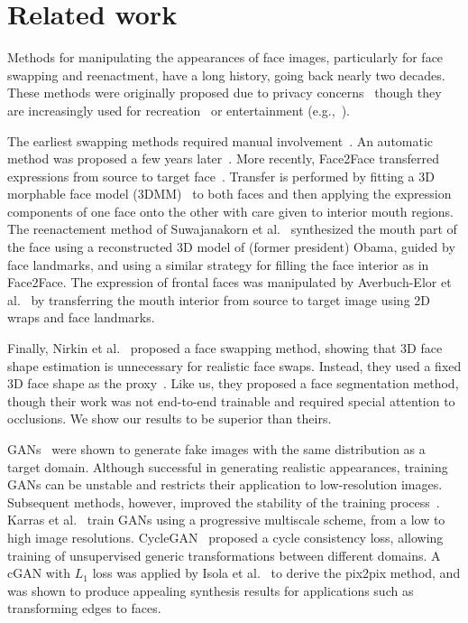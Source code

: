 \section{Related work}\label{sec:related_work}
Methods for manipulating the appearances of face images, particularly for face swapping and reenactment, have a long history, going back nearly two decades. These methods were originally proposed due to privacy concerns~\cite{blanz2004exchanging,lin2012face,mosaddegh2014photorealistic} though they are increasingly used for recreation~\cite{kemelmacher2016transfiguring} or entertainment (e.g.,~\cite{alexander2009creating,wolf2010eye}). %

The earliest swapping methods required manual involvement~\cite{blanz2004exchanging}. An automatic method was proposed a few years later~\cite{bitouk2008face}. More recently, Face2Face transferred expressions from source to target face~\cite{thies2016face2face}. Transfer is performed by fitting a 3D morphable face model (3DMM)~\cite{blanz2002face,blanz2003face,chang2019deep} to both faces and then applying the expression components of one face onto the other with care given to interior mouth regions. The reenactement method of Suwajanakorn et al.~\cite{suwajanakorn2017synthesizing} synthesized the mouth part of the face using a reconstructed 3D model of (former president) Obama, guided by face landmarks, and using a similar strategy for filling the face interior as in Face2Face. The expression of frontal faces was manipulated by Averbuch-Elor et al.~\cite{averbuch2017bringing} by transferring the mouth interior from source to target image using 2D wraps and face landmarks. 

Finally, Nirkin et al.~\cite{nirkin2018face} proposed a face swapping method, showing that 3D face shape estimation is unnecessary for realistic face swaps. Instead, they used a fixed 3D face shape as the proxy~\cite{hassner2015effective,masi2019face}. Like us, they proposed a face segmentation method, though their work was not end-to-end trainable and required special attention to occlusions. We show our results to be superior than theirs.

 GANs~\cite{goodfellow2014generative} were shown to generate fake images with the same distribution as a target domain. Although successful in generating realistic appearances, training GANs can be unstable and restricts their application to low-resolution images. Subsequent methods, however, improved the stability of the training process~\cite{mao2017least,arjovsky2017wasserstein}. Karras et al.~\cite{karras2017progressive} train GANs using a progressive multiscale scheme, from a low to high image resolutions. CycleGAN~\cite{zhu2017unpaired} proposed a cycle consistency loss, allowing training of unsupervised generic transformations between different domains. A cGAN with $L_{1}$ loss was applied by Isola et al.~\cite{isola2017image} to derive the pix2pix method, and was shown to produce appealing synthesis results for applications such as transforming edges to faces. 

